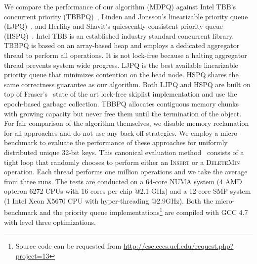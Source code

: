 \documentclass[10pt,journal,letter,compsoc]{IEEEtran}
\begin{document}
We compare the performance of our algorithm (MDPQ) against Intel TBB's concurrent priority (TBBPQ)~\cite{reinders2007intel}, Linden and Jonsson's linearizable priority queue (LJPQ)~\cite{linden2013skiplist}, and Herlihy and Shavit's quiescently consistent priority queue (HSPQ)~\cite{herlihy2012art}.
Intel TBB is an established industry standard concurrent library.
TBBPQ is based on an array-based heap and employs a dedicated aggregator thread to perform all operations.
It is not lock-free because a halting aggregator thread prevents system wide progress.
LJPQ is the best available linearizable priority queue that minimizes contention on the head node.
HSPQ shares the same correctness guarantee as our algorithm.
Both LJPQ and HSPQ are built on top of Fraser's~\cite{fraser2004practical} state of the art lock-free skiplist implementation and use the epoch-based garbage collection.
TBBPQ allocates contiguous memory chunks with growing capacity but never free them until the termination of the object.
For fair comparison of the algorithm themselves, we disable memory reclamation for all approaches and do not use any back-off strategies.
We employ a micro-benchmark to evaluate the performance of these approaches for uniformly distributed unique 32-bit keys.
This canonical evaluation method~\cite{harris2001pragmatic,shavit2000skiplist,linden2013skiplist,sundell2005fast} consists of a tight loop that randomly chooses to perform either an \textsc{Insert} or a \textsc{DeleteMin} operation. 
Each thread performs one million operations and we take the average from three runs.
The tests are conducted on a 64-core NUMA system (4 AMD opteron 6272 CPUs with 16 cores per chip @2.1 GHz) and a 12-core SMP system (1 Intel Xeon X5670 CPU with hyper-threading @2.9GHz). 
Both the micro-benchmark and the priority queue implementations\footnote{Source code can be requested from \url{http://cse.eecs.ucf.edu/request.php?project=13}} are compiled with GCC 4.7 with level three optimizations.
\end{document}

